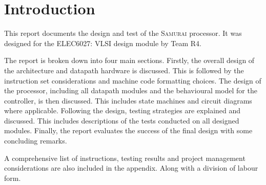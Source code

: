 

\chapter{Introduction}


This report documents the design and test of the \textsc{Samurai} processor. 
It was designed for the ELEC6027: VLSI design module by Team R4.

The report is broken down into four main sections.
Firstly, the overall design of the architecture and datapath hardware is discussed. 
This is followed by the instruction set considerations and machine code formatting choices. 
The design of the processor, including all datapath modules and the behavioural model for the controller, is then discussed.
This includes state machines and circuit diagrams where applicable. 
Following the design, testing strategies are explained and discussed. 
This includes descriptions of the tests conducted on all designed modules. 
Finally, the report evaluates the success of the final design with some concluding remarks. 

A comprehensive list of instructions, testing results and project management considerations are also included in the appendix.
Along with a division of labour form. 